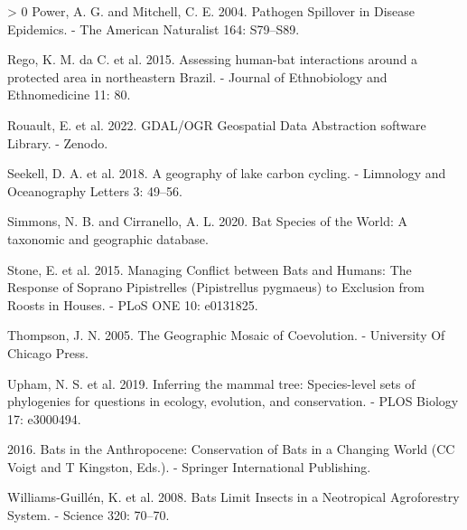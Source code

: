 \documentclass[11pt]{article}
\newlength{\cslhangindent}
\newenvironment{CSLReferences}[3] %
 {%
  \setlength{\parindent}{0pt}
  \ifodd #1 \everypar{\setlength{\hangindent}{\cslhangindent}}\ignorespaces\fi
  \ifnum #2 > 0
  \setlength{\parskip}{#2\baselineskip}
  \fi
 }%
 {}
\begin{document}
\begin{CSLReferences}{1}{0}
\leavevmode\hypertarget{ref-Power2004PatSpi}{}%
Power, A. G. and Mitchell, C. E. 2004. Pathogen Spillover in Disease
Epidemics. - The American Naturalist 164: S79--S89.

\leavevmode\hypertarget{ref-Rego2015AssHum}{}%
Rego, K. M. da C. et al. 2015. Assessing human-bat interactions around a
protected area in northeastern Brazil. - Journal of Ethnobiology and
Ethnomedicine 11: 80.

\leavevmode\hypertarget{ref-RouaultEven2022GdaOgr}{}%
Rouault, E. et al. 2022. GDAL/OGR Geospatial Data Abstraction software
Library. - Zenodo.

\leavevmode\hypertarget{ref-Seekell2018GeoLak}{}%
Seekell, D. A. et al. 2018. A geography of lake carbon cycling. -
Limnology and Oceanography Letters 3: 49--56.

\leavevmode\hypertarget{ref-Simmons2020BatSpe}{}%
Simmons, N. B. and Cirranello, A. L. 2020. Bat Species of the World: A
taxonomic and geographic database.

\leavevmode\hypertarget{ref-Stone2015ManCon}{}%
Stone, E. et al. 2015. Managing Conflict between Bats and Humans: The
Response of Soprano Pipistrelles (Pipistrellus pygmaeus) to Exclusion
from Roosts in Houses. - PLoS ONE 10: e0131825.

\leavevmode\hypertarget{ref-Thompson2005GeoMos}{}%
Thompson, J. N. 2005. The Geographic Mosaic of Coevolution. - University
Of Chicago Press.

\leavevmode\hypertarget{ref-Upham2019InfMam}{}%
Upham, N. S. et al. 2019. Inferring the mammal tree: Species-level sets
of phylogenies for questions in ecology, evolution, and conservation. -
PLOS Biology 17: e3000494.

\leavevmode\hypertarget{ref-Voigt2016BatAnt}{}%
2016. Bats in the Anthropocene: Conservation of Bats in a Changing World
(CC Voigt and T Kingston, Eds.). - Springer International Publishing.

\leavevmode\hypertarget{ref-Williams-Guillen2008BatLim}{}%
Williams-Guillén, K. et al. 2008. Bats Limit Insects in a Neotropical
Agroforestry System. - Science 320: 70--70.

\end{CSLReferences}
\end{document}
